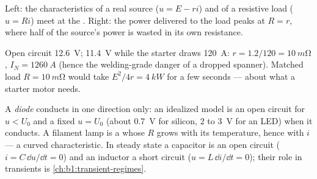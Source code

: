 \begin{omfigure}
\qquad
{}

{\small Left: the characteristics of a real source ($u = E - ri$) and
of a resistive load ($u = Ri$) meet at the . Right: the
power delivered to the load peaks at $R = r$, where half of the source's
power is wasted in its own resistance.}
\end{omfigure}

\begin{example}\label{ex:b1:dc-circuits:battery}
Open circuit \qty{12.6}{V}; \qty{11.4}{V} while the starter draws
\qty{120}{A}: $r = 1.2/120 = \qty{10}{m\ohm}$, $I_N = \qty{1260}{A}$
(hence the welding-grade danger of a dropped spanner). Matched load
$R = \qty{10}{m\ohm}$ would take $E^2/4r = \qty{4}{kW}$ for a few
seconds --- about what a starter motor needs.
\end{example}

\begin{remark}\label{rem:b1:dc-circuits:others}
A \emph{diode} conducts in one direction only: an idealized model is an
open circuit for $u < U_0$ and a fixed  $u = U_0$ (about
\qty{0.7}{V} for silicon, \qty{2}{} to \qty{3}{V} for an LED) when it
conducts. A filament lamp is a  whose $R$ grows with its
temperature, hence with $i$ --- a curved characteristic. In steady
state a capacitor is an open circuit ($i = C\,\dd u/\dd t = 0$) and an
inductor a short circuit ($u = L\,\dd i/\dd t = 0$); their role in
transients is \cref{ch:b1:transient-regimes}.
\end{remark}

